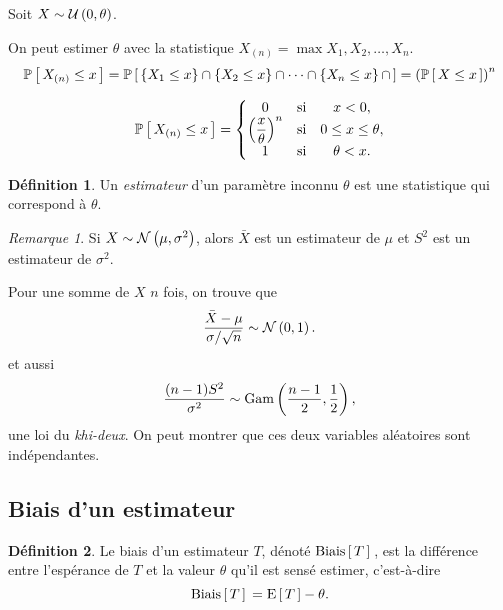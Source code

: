 \documentclass[11pt]{article}
\makeatletter
\renewcommand\P[1]{%
	\ensuremath{%
		\mathbb{P}\left[\,#1\,\right]%
	}%
}%
\newcommand\Uni[2]{%
	\ensuremath{%
		\mathcal{U}\left(#1,#2\right)%
	}%
}%
\newcommand\Gam[2]{%
	\ensuremath{%
		\mathrm{Gam}\left(#1,#2\right)%
	}%
}%
\newcommand\Norm[2]{%
	\ensuremath{%
		\mathcal{N}\left(#1,#2\right)%
	}%
}%
\newcommand\Esp[1]{%
	\ensuremath{%
		\mathrm{E}\left[\,#1\,\right]%
	}%
}%
\newcommand\Biais[1]{%
	\ensuremath{%
		\mathrm{Biais}\left[\,#1\,\right]\,%
	}%
}%
\theoremstyle{remark}
\newtheorem*{remark}{Remarque}
\theoremstyle{definition}
\newtheorem*{@definition}{Définition}
\newenvironment{definition}{%
	\begin{@definition}%
}{%
	\end{@definition}%
	\setcounter{property}{0}%
}
\makeatother
\begin{document}
\begin{exemple}
	Soit $X\sim\Uni{0}{\theta}$.

	On peut estimer $\theta$ avec la statistique $X_{(n)}=\max{X_1,X_2,\dots,
	X_n}$.
	\begin{equation*}
		\P{X_{(n)}\leq x}
		=\P{
			\left\{X_1\leq x\right\}\cap
			\left\{X_2\leq x\right\}\cap
			\cdots\cap
			\left\{X_n\leq x\right\}\cap}
		=\left(\P{X\leq x}\right)^n
	\end{equation*}

	\begin{equation*}
		\P{X_{(n)}\leq x}
		=\left\{
			\begin{matrix}
				0 & \text{si} & x<0,\\
				\left(\dfrac{x}{\theta}\right)^n 
				  & \text{si} & 0\leq x\leq\theta,\\
				1 & \text{si} & \theta<x.\\
			\end{matrix}
		\right.
	\end{equation*}
\end{exemple}

\begin{definition}
	Un \textit{estimateur} d'un paramètre inconnu $\theta$ est une statistique
	qui correspond à $\theta$.
\end{definition}

\begin{remark}
	Si $X\sim\Norm{\mu}{\sigma^2}$, alors $\bar{X}$ est un estimateur de $\mu$
	et $S^2$ est un estimateur de $\sigma^2$.

	Pour une somme de $X$ $n$ fois, on trouve que
	\begin{equation*}
		\frac{\bar{X}-\mu}{\sigma/\sqrt{n}}\sim\Norm{0}{1}.
	\end{equation*}
	et aussi
	\begin{equation*}
		\frac{(n-1)S^2}{\sigma^2}\sim\Gam{\frac{n-1}{2}}{\frac{1}{2}},
	\end{equation*}
	une loi du \textit{khi-deux}. On peut montrer que ces deux variables
	aléatoires sont indépendantes.
\end{remark}

\subsection{Biais d'un estimateur}
\begin{definition}
	Le biais d'un estimateur $T$, dénoté $\Biais{T}$, est la différence entre
	l'espérance de $T$ et la valeur $\theta$ qu'il est sensé estimer,
	c'est-à-dire
	\begin{equation*}
		\Biais{T}=\Esp{T}-\theta.
	\end{equation*}
\end{definition}
\end{document}
